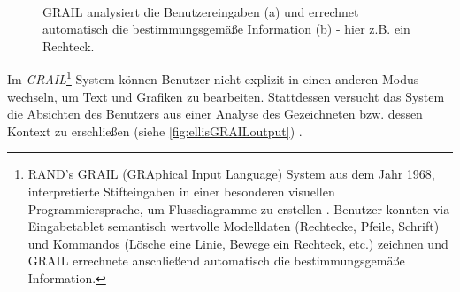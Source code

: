 \begin{figure}
        \myfloatalign
         \quad
         \\
        \caption[GRAIL Funktionalität \newline \citep{Johnson:2009}]{GRAIL analysiert die Benutzereingaben (a) und errechnet automatisch die bestimmungsgemäße Information (b) - hier z.B. ein Rechteck.}\label{fig:ellisGRAILoutput}
\end{figure}

\medskip Im \emph{GRAIL}\footnote{RAND's GRAIL (GRAphical Input Language) System aus dem Jahr 1968, interpretierte Stifteingaben in einer besonderen visuellen Programmiersprache, um Flussdiagramme zu erstellen \citep{Ellis:1969}. Benutzer konnten via Eingabetablet semantisch wertvolle Modelldaten (Rechtecke, Pfeile, Schrift) und Kommandos (Lösche eine Linie, Bewege ein Rechteck, etc.) zeichnen und GRAIL errechnete anschließend automatisch die bestimmungsgemäße Information.} System können Benutzer nicht explizit in einen anderen Modus wechseln, um Text und Grafiken zu bearbeiten. Stattdessen versucht das System die Absichten des Benutzers aus einer Analyse des Gezeichneten bzw. dessen Kontext zu erschließen (siehe \autoref{fig:ellisGRAILoutput}) \citep{Ellis:1969}. 

